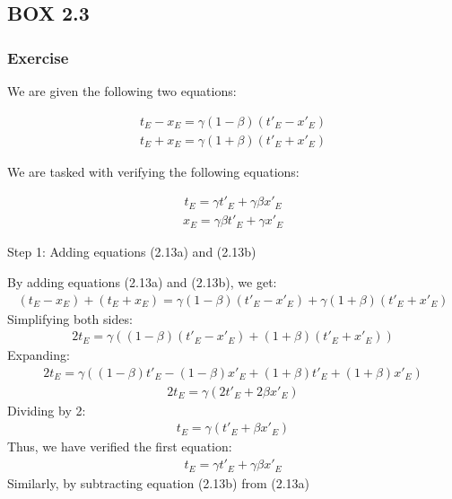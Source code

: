 \documentclass[12pt]{book}
\begin{document}
\subsection{BOX 2.3}
    \subsubsection{Exercise}
    We are given the following two equations:

\begin{align}
t_E - x_E = \gamma (1 - \beta)(t'_E - x'_E) \tag{2.13a}
\end{align}
\begin{align}
t_E + x_E = \gamma (1 + \beta)(t'_E + x'_E) \tag{2.13b}
\end{align}

We are tasked with verifying the following equations:

\begin{align}
t_E = \gamma t'_E + \gamma \beta x'_E
\end{align}
\begin{align}
x_E = \gamma \beta t'_E + \gamma x'_E
\end{align}

Step 1:  Adding equations (2.13a) and (2.13b)

By adding equations (2.13a) and (2.13b), we get:
\begin{align}
(t_E - x_E) + (t_E + x_E) = \gamma (1 - \beta)(t'_E - x'_E) + \gamma (1 + \beta)(t'_E + x'_E)
\end{align}
Simplifying both sides:
\begin{align}
2t_E = \gamma \left( (1 - \beta)(t'_E - x'_E) + (1 + \beta)(t'_E + x'_E) \right)
\end{align}
Expanding:
\begin{align}
2t_E = \gamma \left( (1 - \beta)t'_E - (1 - \beta)x'_E + (1 + \beta)t'_E + (1 + \beta)x'_E \right)
\end{align}
\begin{align}
2t_E = \gamma \left( 2t'_E + 2\beta x'_E \right)
\end{align}
Dividing by 2:
\begin{align}
t_E = \gamma (t'_E + \beta x'_E)
\end{align}
Thus, we have verified the first equation:
\begin{align}
t_E = \gamma t'_E + \gamma \beta x'_E
\end{align}
Similarly, by subtracting equation (2.13b) from (2.13a)
\end{document}
